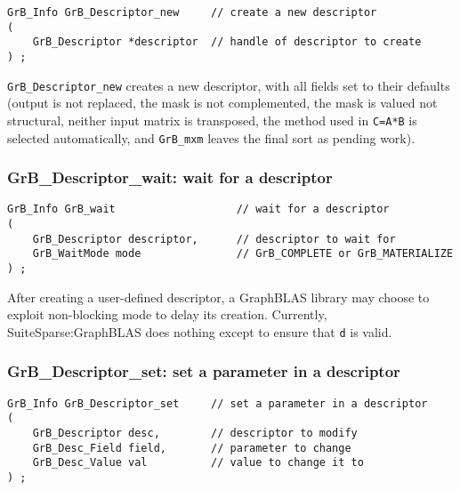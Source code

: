 \documentclass[12pt]{article}
\begin{document}
\begin{mdframed}[userdefinedwidth=6in]
{\footnotesize
\begin{verbatim}
GrB_Info GrB_Descriptor_new     // create a new descriptor
(
    GrB_Descriptor *descriptor  // handle of descriptor to create
) ;
\end{verbatim} } \end{mdframed}

\verb'GrB_Descriptor_new' creates a new descriptor, with all fields set to
their defaults (output is not replaced, the mask is not complemented, the mask
is valued not structural, neither input matrix is transposed, the method
used in \verb'C=A*B' is selected automatically, and \verb'GrB_mxm' leaves
the final sort as pending work).

\subsubsection{{\sf GrB\_Descriptor\_wait:} wait for a descriptor}
\label{descriptor_wait}

\begin{mdframed}[userdefinedwidth=6in]
{\footnotesize
\begin{verbatim}
GrB_Info GrB_wait                   // wait for a descriptor
(
    GrB_Descriptor descriptor,      // descriptor to wait for
    GrB_WaitMode mode               // GrB_COMPLETE or GrB_MATERIALIZE
) ;
\end{verbatim}
}\end{mdframed}

After creating a user-defined descriptor, a GraphBLAS library may choose to
exploit non-blocking mode to delay its creation.  Currently,
SuiteSparse:GraphBLAS does nothing except to ensure that \verb'd' is valid.

\newpage
\subsubsection{{\sf GrB\_Descriptor\_set:}  set a parameter in a descriptor}
\label{descriptor_set}

\begin{mdframed}[userdefinedwidth=6in]
{\footnotesize
\begin{verbatim}
GrB_Info GrB_Descriptor_set     // set a parameter in a descriptor
(
    GrB_Descriptor desc,        // descriptor to modify
    GrB_Desc_Field field,       // parameter to change
    GrB_Desc_Value val          // value to change it to
) ;
\end{verbatim} } \end{mdframed}
\end{document}
